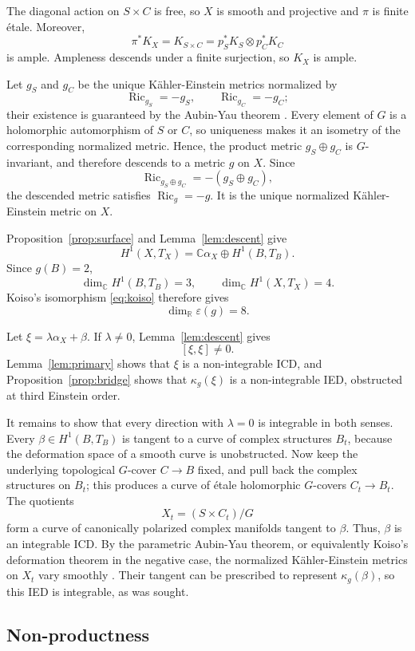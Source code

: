 \documentclass[11pt]{amsart}
\numberwithin{equation}{section}
\theoremstyle{plain}
\theoremstyle{definition}
\newcommand{\C}{\mathbb{C}}
\newcommand{\R}{\mathbb{R}}
\DeclareMathOperator{\Ric}{Ric}
\begin{document}
The diagonal action on $S\times C$ is free, so $X$ is smooth and projective and $\pi$ is finite \'etale. Moreover,
$$\pi^*K_X=K_{S\times C}=p_S^*K_S\otimes p_C^*K_C$$
is ample. Ampleness descends under a finite surjection, so $K_X$ is ample.

Let $g_S$ and $g_C$ be the unique K\"ahler-Einstein metrics normalized by
$$\Ric_{g_S}=-g_S,
\qquad
\Ric_{g_C}=-g_C;$$
their existence is guaranteed by the Aubin-Yau theorem \cite{Aubin,Yau}. Every element of $G$ is a holomorphic automorphism of $S$ or $C$, so uniqueness makes it an isometry of the corresponding normalized metric. Hence, the product metric $g_S\oplus g_C$ is $G$-invariant, and therefore descends to a metric $g$ on $X$. Since
$$\Ric_{g_S\oplus g_C}=-(g_S\oplus g_C),$$
the descended metric satisfies $\Ric_g=-g$. It is the unique normalized K\"ahler-Einstein metric on $X$.

Proposition~\ref{prop:surface} and Lemma~\ref{lem:descent} give
$$H^1(X,T_X)=\C\alpha_X\oplus H^1(B,T_B).$$
Since $g(B)=2$,
$$\dim_{\C}H^1(B,T_B)=3,
\qquad
\dim_{\C}H^1(X,T_X)=4.$$
Koiso's isomorphism \eqref{eq:koiso} therefore gives
$$\dim_{\R}\varepsilon(g)=8.$$

Let $\xi=\lambda\alpha_X+\beta$. If $\lambda\neq0$, Lemma~\ref{lem:descent} gives
$$[\xi,\xi]\neq0.$$
Lemma~\ref{lem:primary} shows that $\xi$ is a non-integrable ICD, and Proposition~\ref{prop:bridge} shows that $\kappa_g(\xi)$ is a non-integrable IED, obstructed at third Einstein order.

It remains to show that every direction with $\lambda=0$ is integrable in both senses. Every $\beta\in H^1(B,T_B)$ is tangent to a curve of complex structures $B_t$, because the deformation space of a smooth curve is unobstructed. Now keep the underlying topological $G$-cover $C\to B$ fixed, and pull back the complex structures on $B_t$; this produces a curve of \'etale holomorphic $G$-covers $C_t\to B_t$. The quotients
$$X_t=(S\times C_t)/G$$
form a curve of canonically polarized complex manifolds tangent to $\beta$. Thus, $\beta$ is an integrable ICD. By the parametric Aubin-Yau theorem, or equivalently Koiso's deformation theorem in the negative case, the normalized K\"ahler-Einstein metrics on $X_t$ vary smoothly \cite[Prop.~10.1]{Koiso}. Their tangent can be prescribed to represent $\kappa_g(\beta)$, so this IED is integrable, as was sought.

\subsection{Non-productness}
\end{document}
